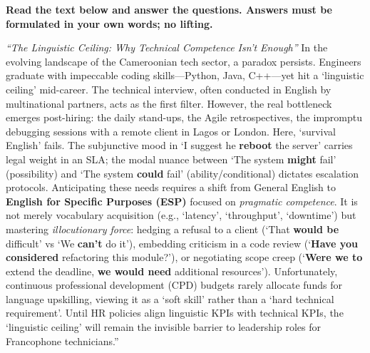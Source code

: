 \documentclass[11pt]{article}
\begin{document}
\begin{exercice}
\textbf{Read the text below and answer the questions. Answers must be formulated in your own words; no lifting.}

\textit{``The Linguistic Ceiling: Why Technical Competence Isn't Enough''}
In the evolving landscape of the Cameroonian tech sector, a paradox persists. Engineers graduate with impeccable coding skills—Python, Java, C++—yet hit a `linguistic ceiling' mid-career. The technical interview, often conducted in English by multinational partners, acts as the first filter. However, the real bottleneck emerges post-hiring: the daily stand-ups, the Agile retrospectives, the impromptu debugging sessions with a remote client in Lagos or London. Here, `survival English' fails. The subjunctive mood in `I suggest he \textbf{reboot} the server' carries legal weight in an SLA; the modal nuance between `The system \textbf{might} fail' (possibility) and `The system \textbf{could} fail' (ability/conditional) dictates escalation protocols. 
Anticipating these needs requires a shift from General English to \textbf{English for Specific Purposes (ESP)} focused on \textit{pragmatic competence}. It is not merely vocabulary acquisition (e.g., `latency', `throughput', `downtime') but mastering \textit{illocutionary force}: hedging a refusal to a client (`That \textbf{would be} difficult' vs `We \textbf{can't} do it'), embedding criticism in a code review (`\textbf{Have you considered} refactoring this module?'), or negotiating scope creep (`\textbf{Were we to} extend the deadline, \textbf{we would need} additional resources'). 
Unfortunately, continuous professional development (CPD) budgets rarely allocate funds for language upskilling, viewing it as a `soft skill' rather than a `hard technical requirement'. Until HR policies align linguistic KPIs with technical KPIs, the `linguistic ceiling' will remain the invisible barrier to leadership roles for Francophone technicians.''


\end{exercice}
\end{document}
